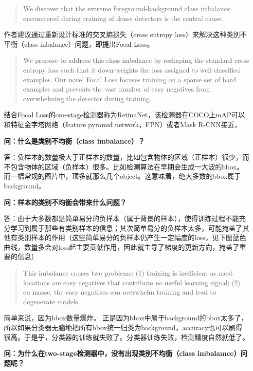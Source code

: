 \begin{quote}
We discover that the extreme foreground-background class imbalance
encountered during training of dense detectors is the central cause.
\end{quote}

作者建议通过重新设计标准的交叉熵损失（cross entropy
loss）来解决这种类别不平衡（class inbalance）问题，即提出Focal Loss。

\begin{quote}
We propose to address this class imbalance by reshaping the standard
cross entropy loss such that it down-weights the loss assigned to
well-classified examples. Our novel Focal Loss focuses training on a
sparse set of hard examples and prevents the vast number of easy
negatives from overwhelming the detector during training.
\end{quote}

结合Focal
Loss的one-stage检测器称为RetinaNet，该检测器在COCO上mAP可以和特征金字塔网络（feature
pyramid network，FPN）或者Mask R-CNN接近，

\textbf{问：什么是类别不均衡（class imbalance）？}

答：负样本的数量极大于正样本的数量，比如包含物体的区域（正样本）很少，而不包含物体的区域（负样本）很多。比如检测算法在早期会生成一大波的bbox。而一幅常规的图片中，顶多就那么几个object。这意味着，绝大多数的bbox属于background。

\textbf{问：样本的类别不均衡会带来什么问题？}

答：由于大多数都是简单易分的负样本（属于背景的样本），使得训练过程不能充分学习到属于那些有类别样本的信息；其次简单易分的负样本太多，可能掩盖了其他有类别样本的作用（这些简单易分的负样本仍产生一定幅度的loss，见下图蓝色曲线，数量多会对loss起主要贡献作用，因此就主导了梯度的更新方向，掩盖了重要的信息）

\begin{quote}
This imbalance causes two problems: (1) training is inefficient as most
locations are easy negatives that contribute no useful learning signal;
(2) en masse, the easy negatives can overwhelm training and lead to
degenerate models.
\end{quote}

简单来说，因为bbox数量爆炸。
正是因为bbox中属于background的bbox太多了，所以如果分类器无脑地把所有bbox统一归类为background，accuracy也可以刷得很高。于是乎，分类器的训练就失败了。分类器训练失败，检测精度自然就低了。

\textbf{问：为什么在two-stage检测器中，没有出现类别不均衡（class
imbalamce）问题呢？}

